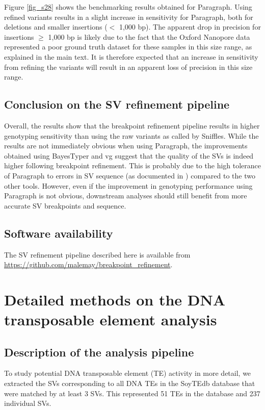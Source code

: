 \documentclass[12pt]{article}
\begin{document}
Figure \ref{fig_s28} shows the benchmarking results obtained for Paragraph.
Using refined variants results in a slight increase in sensitivity for Paragraph, both for deletions and smaller insertions ($<$ 1,000 bp).
The apparent drop in precision for insertions $\geq$ 1,000 bp is likely due to the fact that the Oxford Nanopore data represented a poor ground truth dataset for these samples in this size range, as explained in the main text.
It is therefore expected that an increase in sensitivity from refining the variants will result in an apparent loss of precision in this size range.

\subsection{Conclusion on the SV refinement pipeline}

Overall, the results show that the breakpoint refinement pipeline results in higher genotyping sensitivity than using the raw variants as called by Sniffles.
While the results are not immediately obvious when using Paragraph, the improvements obtained using BayesTyper and vg suggest that the quality of the SVs is indeed higher following breakpoint refinement.
This is probably due to the high tolerance of Paragraph to errors in SV sequence (as documented in \cite{paragraph}) compared to the two other tools.
However, even if the improvement in genotyping performance using Paragraph is not obvious, downstream analyses should still benefit from more accurate SV breakpoints and sequence.

\subsection{Software availability}

The SV refinement pipeline described here is available from \url{https://github.com/malemay/breakpoint_refinement}.

\clearpage

\section{Detailed methods on the DNA transposable element analysis}

\subsection{Description of the analysis pipeline}

To study potential DNA transposable element (TE) activity in more detail, we extracted the SVs corresponding to all DNA TEs in the SoyTEdb database \citep{soytedb} that were matched by at least 3 SVs. 
This represented 51 TEs in the database and 237 individual SVs.
\end{document}

